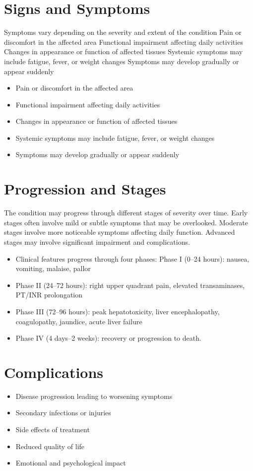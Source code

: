 \section{Signs and Symptoms}
Symptoms vary depending on the severity and extent of the condition Pain or discomfort in the affected area Functional impairment affecting daily activities Changes in appearance or function of affected tissues Systemic symptoms may include fatigue, fever, or weight changes Symptoms may develop gradually or appear suddenly

\begin{itemize}[noitemsep]
  \item Pain or discomfort in the affected area
  \item Functional impairment affecting daily activities
  \item Changes in appearance or function of affected tissues
  \item Systemic symptoms may include fatigue, fever, or weight changes
  \item Symptoms may develop gradually or appear suddenly
\end{itemize}
\section{Progression and Stages}
The condition may progress through different stages of severity over time. Early stages often involve mild or subtle symptoms that may be overlooked. Moderate stages involve more noticeable symptoms affecting daily function. Advanced stages may involve significant impairment and complications.

\begin{itemize}[noitemsep]
  \item Clinical features progress through four phases: Phase I (0--24 hours): nausea, vomiting, malaise, pallor
  \item Phase II (24--72 hours): right upper quadrant pain, elevated transaminases, PT/INR prolongation
  \item Phase III (72--96 hours): peak hepatotoxicity, liver encephalopathy, coagulopathy, jaundice, acute liver failure
  \item Phase IV (4 days--2 weeks): recovery or progression to death.
\end{itemize}
\section{Complications}
\begin{itemize}[noitemsep]
  \item Disease progression leading to worsening symptoms
  \item Secondary infections or injuries
  \item Side effects of treatment
  \item Reduced quality of life
  \item Emotional and psychological impact
\end{itemize}
